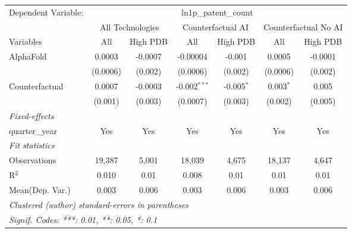 \begingroup
\centering
\begin{tabular}{lcccccc}
   \tabularnewline \midrule \midrule
   Dependent Variable: & \multicolumn{6}{c}{ln1p\_patent\_count}\\
 & \multicolumn{2}{c}{All Technologies} & \multicolumn{2}{c}{Counterfactual AI} & \multicolumn{2}{c}{Counterfactual No AI} \\
\cmidrule(lr){1-1}\cmidrule(lr){2-3} \cmidrule(lr){4-5} \cmidrule(lr){6-7}
Variables & \multicolumn{1}{c}{All} & \multicolumn{1}{c}{High PDB} & \multicolumn{1}{c}{All} & \multicolumn{1}{c}{High PDB} & \multicolumn{1}{c}{All} & \multicolumn{1}{c}{High PDB} \\
\cmidrule(lr){1-1}\cmidrule(lr){2-2} \cmidrule(lr){3-3} \cmidrule(lr){4-4} \cmidrule(lr){5-5} \cmidrule(lr){6-6} \cmidrule(lr){7-7}
   AlphaFold      & 0.0003   & -0.0007 & -0.00004       & -0.001       & 0.0005      & -0.0001\\   
                  & (0.0006) & (0.002) & (0.0006)       & (0.002)      & (0.0006)    & (0.002)\\   
   Counterfactual & 0.0007   & -0.0003 & -0.002$^{***}$ & -0.005$^{*}$ & 0.003$^{*}$ & 0.005\\   
                  & (0.001)  & (0.003) & (0.0007)       & (0.003)      & (0.002)     & (0.005)\\   
   \midrule
   \emph{Fixed-effects}\\
   quarter\_year  & Yes      & Yes     & Yes            & Yes          & Yes         & Yes\\  
   \midrule
   \emph{Fit statistics}\\
   Observations   & 19,387   & 5,001   & 18,039         & 4,675        & 18,137      & 4,647\\  
   R$^2$          & 0.010    & 0.01    & 0.008          & 0.01         & 0.01        & 0.01\\  
Mean(Dep. Var.) & 0.003 & 0.006 & 0.003 & 0.006 & 0.003 & 0.006 \\
   \midrule \midrule
   \multicolumn{7}{l}{\emph{Clustered (author) standard-errors in parentheses}}\\
   \multicolumn{7}{l}{\emph{Signif. Codes: ***: 0.01, **: 0.05, *: 0.1}}\\
\end{tabular}
\par\endgroup
